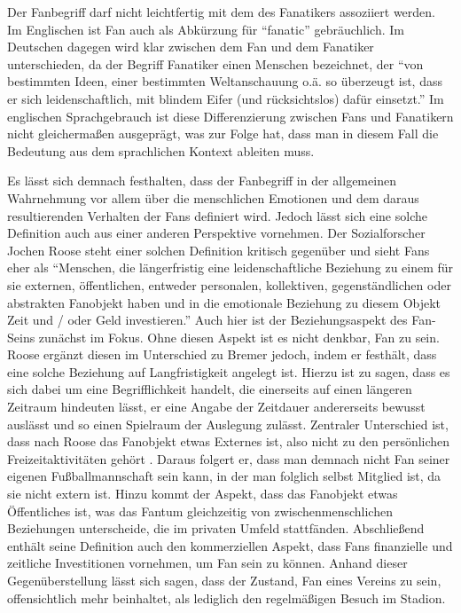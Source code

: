 Der Fanbegriff darf nicht leichtfertig mit dem des Fanatikers assoziiert werden.
Im Englischen ist Fan auch als Abkürzung für "`fanatic"' gebräuchlich.
Im Deutschen dagegen wird klar zwischen dem Fan und dem Fanatiker unterschieden, da der Begriff Fanatiker einen Menschen bezeichnet, der "`von bestimmten Ideen, einer bestimmten Weltanschauung o.ä. so überzeugt ist, dass er sich leidenschaftlich, mit blindem Eifer (und rücksichtslos) dafür einsetzt."' \cite[S. 2]{HS08}
Im englischen Sprachgebrauch ist diese Differenzierung zwischen Fans und Fanatikern nicht gleichermaßen ausgeprägt, was zur Folge hat, dass man in diesem Fall die Bedeutung aus dem sprachlichen Kontext ableiten muss.

Es lässt sich demnach festhalten, dass der Fanbegriff in der allgemeinen Wahrnehmung vor allem über die menschlichen Emotionen und dem daraus resultierenden Verhalten der Fans definiert wird.
Jedoch lässt sich eine solche Definition auch aus einer anderen Perspektive vornehmen.
Der Sozialforscher Jochen Roose steht einer solchen Definition kritisch gegenüber und sieht Fans eher als "`Menschen, die längerfristig eine leidenschaftliche Beziehung zu einem für sie externen, öffentlichen, entweder personalen, kollektiven, gegenständlichen oder abstrakten Fanobjekt haben und in die emotionale Beziehung zu diesem Objekt Zeit und / oder Geld investieren."' \cite[S. 3]{HS08}
Auch hier ist der Beziehungsaspekt des Fan-Seins zunächst im Fokus.
Ohne diesen Aspekt ist es nicht denkbar, Fan zu sein.
Roose ergänzt diesen im Unterschied zu Bremer jedoch, indem er festhält, dass eine solche Beziehung auf Langfristigkeit angelegt ist.
Hierzu ist zu sagen, dass es sich dabei um eine Begrifflichkeit handelt, die einerseits auf einen längeren Zeitraum hindeuten lässt, er eine Angabe der Zeitdauer andererseits bewusst auslässt und so einen Spielraum der Auslegung zulässt.
Zentraler Unterschied ist, dass nach Roose das Fanobjekt etwas Externes ist, also nicht zu den persönlichen Freizeitaktivitäten gehört \cite[S. 4]{HS08}.
Daraus folgert er, dass man demnach nicht Fan seiner eigenen Fußballmannschaft sein kann, in der man folglich selbst Mitglied ist, da sie nicht extern ist.
Hinzu kommt der Aspekt, dass das Fanobjekt etwas Öffentliches ist, was das Fantum gleichzeitig von zwischenmenschlichen Beziehungen unterscheide, die im privaten Umfeld stattfänden.
Abschließend enthält seine Definition auch den kommerziellen Aspekt, dass Fans finanzielle und zeitliche Investitionen vornehmen, um Fan sein zu können.
Anhand dieser Gegenüberstellung lässt sich sagen, dass der Zustand, Fan eines Vereins zu sein, offensichtlich mehr beinhaltet, als lediglich den regelmäßigen Besuch im Stadion.

